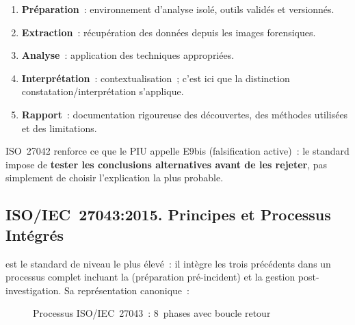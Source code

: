 \begin{enumerate}
    \item \textbf{Préparation}~: environnement d'analyse isolé, outils
          validés et versionnés.
    \item \textbf{Extraction}~: récupération des données depuis les
          images forensiques.
    \item \textbf{Analyse}~: application des techniques appropriées.
    \item \textbf{Interprétation}~: contextualisation~; c'est ici que
          la distinction constatation/interprétation s'applique.
    \item \textbf{Rapport}~: documentation rigoureuse des découvertes,
          des méthodes utilisées et des limitations.
\end{enumerate}

ISO~27042 renforce ce que le PIU appelle E9bis (falsification active)~:
le standard impose de \textbf{tester les conclusions alternatives avant
de les rejeter}, pas simplement de choisir l'explication la plus probable.

\subsection{ISO/IEC~27043:2015. Principes et Processus Intégrés}

 est le standard de niveau le plus élevé~:
il intègre les trois précédents dans un processus complet incluant la
 (préparation pré-incident) et la gestion
post-investigation. Sa représentation canonique~:

\begin{figure}[H]
\centering
{}
\caption{Processus ISO/IEC~27043~: 8~phases avec boucle retour}
\label{fig:iso27043}
\end{figure}

